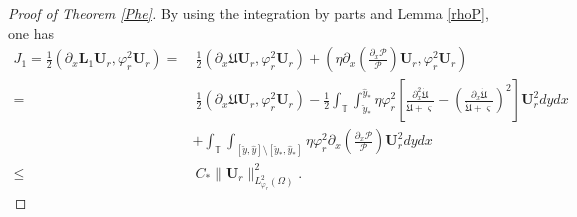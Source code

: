 \documentclass[10pt,a4paper]{amsart}
\begin{document}
\begin{proof}[Proof of Theorem \ref{Phe}]
By using the integration by parts and Lemma \ref{rhoP}, one has
\begin{align*}
J_{1}
=\frac{1}{2}(\partial_{x}\mathbf{L}_{1}\mathbf{U}_{r},\varphi_{r}^{2}\mathbf{U}_{r})
=&~\frac{1}{2}(\partial_{x}\mathfrak{U}\mathbf{U}_{r},\varphi_{r}^{2}\mathbf{U}_{r})
  +\left(\eta\partial_{x}\left(\frac{\partial_{x}\mathcal{P}}{\mathcal{P}}\right)\mathbf{U}_{r},\varphi_{r}^{2}\mathbf{U}_{r}\right)\\
=&~\frac{1}{2}(\partial_{x}\mathfrak{U}\mathbf{U}_{r},\varphi_{r}^{2}\mathbf{U}_{r})
  -\frac{1}{2}\int_{\mathbb{T}}\int_{\check{y}_{*}}^{\hat{y}_{*}}\eta\varphi_{r}^{2}\left[\frac{\partial_{x}^{2}\dot{\mathfrak{U}}}{\dot{\mathfrak{U}}+\varsigma}-\left(\frac{\partial_{x}\dot{\mathfrak{U}}}{\dot{\mathfrak{U}}+\varsigma}\right)^{2}\right]\mathbf{U}_{r}^{2}dydx\\
 &+\int_{\mathbb{T}}\int_{[\check{y},\hat{y}]\setminus[\check{y}_{*},\hat{y}_{*}]}\eta\varphi_{r}^{2}\partial_{x}\left(\frac{\partial_{x}\mathcal{P}}{\mathcal{P}}\right)\mathbf{U}_{r}^{2}dydx\\
\leq&~C_{*}\|\mathbf{U}_{r}\|_{L_{\varphi_{r}}^{2}(\Omega)}^{2}.
\end{align*}




\end{proof}
\end{document}
